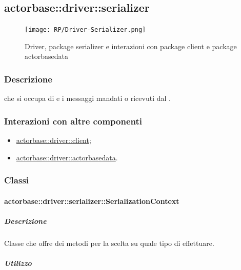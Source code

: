\documentclass{scalatekids-article}
\begin{document}
\subsection{actorbase::driver::serializer}
\label{sec:actorbase::driver::serializer}

\begin{figure}[H]
  \begin{center}
    \texttt{[image: RP/Driver-Serializer.png]}
    \caption{Driver, package serializer e interazioni con package client e package actorbasedata}
  \end{center}
\end{figure}

\subsubsection{Descrizione}

 che si occupa di  e 
i messaggi mandati o ricevuti dal .

\subsubsection{Interazioni con altre componenti}

\begin{itemize}

\item \hyperref[sec:actorbase::driver::client]{actorbase::driver::client};
\item \hyperref[sec:actorbase::driver::actorbasedata]{actorbase::driver::actorbasedata}.

\end{itemize}

\subsubsection{Classi}

\paragraph{actorbase::driver::serializer::SerializationContext}
\label{sec:actorbase::driver::serializer::SerializationContext}

\subparagraph{Descrizione}

Classe che offre dei metodi per la scelta su quale tipo di 
effettuare.

\subparagraph{Utilizzo}
\end{document}
